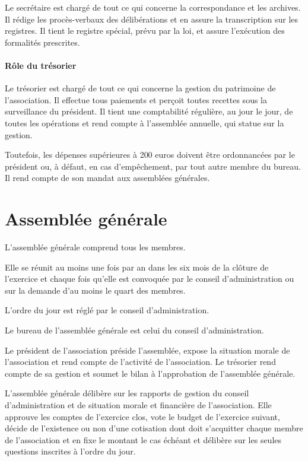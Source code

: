 \documentclass[12 pt]{article}
\begin{document}
Le secrétaire est chargé de tout ce qui concerne la correspondance et
les archives.  Il rédige les procès-verbaux des délibérations et en
assure la transcription sur les registres.  Il tient le registre
spécial, prévu par la loi, et assure l'exécution des formalités
prescrites.

\paragraph{Rôle du trésorier}

Le trésorier est chargé de tout ce qui concerne la gestion du
patrimoine de l'association. Il effectue tous paiements et perçoit
toutes recettes sous la surveillance du président.  Il tient une
comptabilité régulière, au jour le jour, de toutes les opérations et
rend compte à l'assemblée annuelle, qui statue sur la
gestion.

Toutefois, les dépenses supérieures à 200 euros doivent être
ordonnancées par le président ou, à défaut, en cas d'empêchement, par
tout autre membre du bureau. Il rend compte de son mandat aux
assemblées générales.

\section{Assemblée générale}
\label{sec:assemblee-generale}

L'assemblée générale comprend tous les membres.

Elle se réunit au moins une fois par an dans les six mois de la
clôture de l'exercice et chaque fois qu'elle est convoquée par le
conseil d'administration ou sur la demande d'au moins le quart des
membres.

L'ordre du jour est réglé par le conseil d'administration.

Le bureau de l'assemblée générale est celui du conseil d'administration.

Le président de l'association préside l'assemblée, expose la situation
morale de l'association et rend compte de l'activité de
l'association. Le trésorier rend compte de sa gestion et soumet le
bilan à l'approbation de l'assemblée générale.

L'assemblée générale délibère sur les rapports de gestion du conseil
d'administration et de situation morale et financière de
l'association. Elle approuve les comptes de l'exercice clos, vote le
budget de l'exercice suivant, décide de l'existence ou non d'une
cotisation dont doit s'acquitter chaque membre de l'association et en
fixe le montant le cas échéant et délibère sur les seules questions
inscrites à l'ordre du jour.
\end{document}
